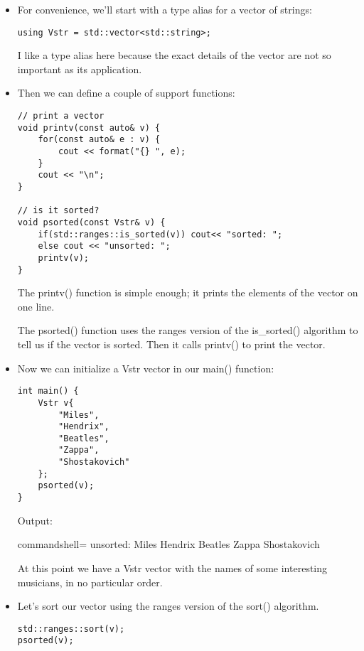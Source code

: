 \begin{itemize}
\item 
For convenience, we'll start with a type alias for a vector of strings:

\begin{lstlisting}[style=styleCXX]
using Vstr = std::vector<std::string>;
\end{lstlisting}

I like a type alias here because the exact details of the vector are not so important as its application.

\item 
Then we can define a couple of support functions:

\begin{lstlisting}[style=styleCXX]
// print a vector
void printv(const auto& v) {
	for(const auto& e : v) {
		cout << format("{} ", e);
	}
	cout << "\n";
}

// is it sorted?
void psorted(const Vstr& v) {
	if(std::ranges::is_sorted(v)) cout<< "sorted: ";
	else cout << "unsorted: ";
	printv(v);
}
\end{lstlisting}

The printv() function is simple enough; it prints the elements of the vector on one line.

The psorted() function uses the ranges version of the is\_sorted() algorithm to tell us if the vector is sorted. Then it calls printv() to print the vector.

\item 
Now we can initialize a Vstr vector in our main() function:

\begin{lstlisting}[style=styleCXX]
int main() {
	Vstr v{
		"Miles",
		"Hendrix",
		"Beatles",
		"Zappa",
		"Shostakovich"
	};
	psorted(v);
}
\end{lstlisting}

Output:

\begin{tcblisting}{commandshell={}}
unsorted: Miles Hendrix Beatles Zappa Shostakovich
\end{tcblisting}

At this point we have a Vstr vector with the names of some interesting musicians, in no particular order.

\item 
Let's sort our vector using the ranges version of the sort() algorithm.

\begin{lstlisting}[style=styleCXX]
std::ranges::sort(v);
psorted(v);
\end{lstlisting}


\end{itemize}
